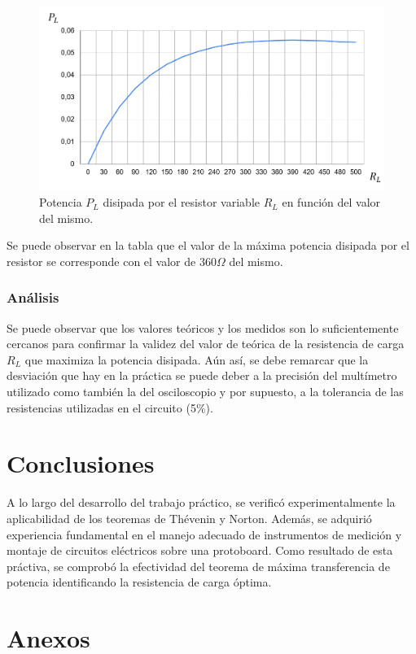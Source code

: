 \documentclass{article}
\begin{document}
            \begin{figure}[H]
                \centering
                \includegraphics[width=1\textwidth]{graficoCuentasTeoricas.png}
                \caption{Potencia $P_L$ disipada por el resistor variable $R_L$ en función del valor del mismo.}
                \label{fig:esquemáticaPotencia}
            \end{figure}

            \quad Se puede observar en la tabla que el valor de la máxima potencia disipada por el resistor se corresponde con el valor de $ 360 \Omega $ del mismo.

            \subsubsection{Análisis}
            \quad Se puede observar que los valores teóricos y los medidos son lo suficientemente cercanos para confirmar 
            la validez del valor de teórica de la resistencia de carga $R_L$ que maximiza la potencia disipada.
            Aún así, se debe remarcar que la desviación que hay en la práctica se puede deber a la precisión del multímetro utilizado como también la del osciloscopio
            y por supuesto, a la tolerancia de las resistencias utilizadas en el circuito (5\%).
    \section{Conclusiones}

    \quad A lo largo del desarrollo del trabajo práctico, se verificó experimentalmente
     la aplicabilidad de los teoremas de Thévenin y Norton. Además, se adquirió experiencia 
     fundamental en el manejo adecuado de instrumentos de medición y montaje de circuitos 
     eléctricos sobre una protoboard. Como resultado de esta práctiva, se comprobó la efectividad 
     del teorema de máxima transferencia de potencia identificando la resistencia de carga óptima.

    \section{Anexos}
\end{document}
